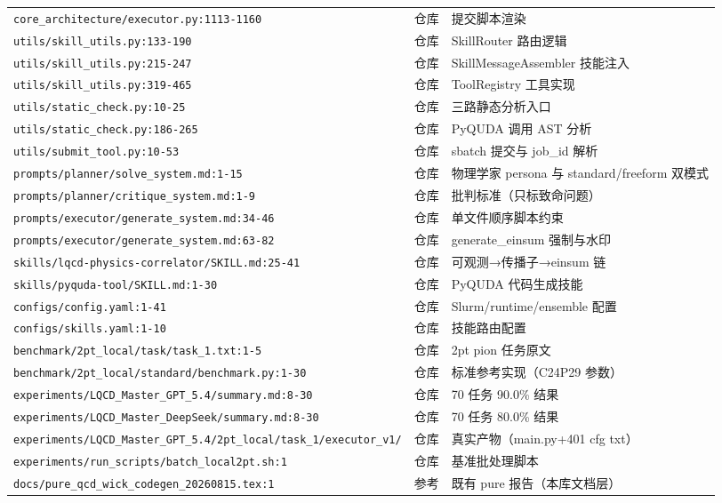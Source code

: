 \documentclass[UTF8]{ctexart}
\begin{document}
\begin{xltabular}{\textwidth}{XlX}
\texttt{\nolinkurl{core_architecture/executor.py:1113-1160}} & 仓库 & 提交脚本渲染 \\
\texttt{\nolinkurl{utils/skill_utils.py:133-190}} & 仓库 & SkillRouter 路由逻辑 \\
\texttt{\nolinkurl{utils/skill_utils.py:215-247}} & 仓库 & SkillMessageAssembler 技能注入 \\
\texttt{\nolinkurl{utils/skill_utils.py:319-465}} & 仓库 & ToolRegistry 工具实现 \\
\texttt{\nolinkurl{utils/static_check.py:10-25}} & 仓库 & 三路静态分析入口 \\
\texttt{\nolinkurl{utils/static_check.py:186-265}} & 仓库 & PyQUDA 调用 AST 分析 \\
\texttt{\nolinkurl{utils/submit_tool.py:10-53}} & 仓库 & sbatch 提交与 job\_id 解析 \\
\texttt{\nolinkurl{prompts/planner/solve_system.md:1-15}} & 仓库 & 物理学家 persona 与 standard/freeform 双模式 \\
\texttt{\nolinkurl{prompts/planner/critique_system.md:1-9}} & 仓库 & 批判标准（只标致命问题） \\
\texttt{\nolinkurl{prompts/executor/generate_system.md:34-46}} & 仓库 & 单文件顺序脚本约束 \\
\texttt{\nolinkurl{prompts/executor/generate_system.md:63-82}} & 仓库 & generate\_einsum 强制与水印 \\
\texttt{\nolinkurl{skills/lqcd-physics-correlator/SKILL.md:25-41}} & 仓库 & 可观测→传播子→einsum 链 \\
\texttt{\nolinkurl{skills/pyquda-tool/SKILL.md:1-30}} & 仓库 & PyQUDA 代码生成技能 \\
\texttt{\nolinkurl{configs/config.yaml:1-41}} & 仓库 & Slurm/runtime/ensemble 配置 \\
\texttt{\nolinkurl{configs/skills.yaml:1-10}} & 仓库 & 技能路由配置 \\
\texttt{\nolinkurl{benchmark/2pt_local/task/task_1.txt:1-5}} & 仓库 & 2pt pion 任务原文 \\
\texttt{\nolinkurl{benchmark/2pt_local/standard/benchmark.py:1-30}} & 仓库 & 标准参考实现（C24P29 参数） \\
\texttt{\nolinkurl{experiments/LQCD_Master_GPT_5.4/summary.md:8-30}} & 仓库 & 70 任务 90.0\% 结果 \\
\texttt{\nolinkurl{experiments/LQCD_Master_DeepSeek/summary.md:8-30}} & 仓库 & 70 任务 80.0\% 结果 \\
\texttt{\nolinkurl{experiments/LQCD_Master_GPT_5.4/2pt_local/task_1/executor_v1/}} & 仓库 & 真实产物（main.py+401 cfg txt） \\
\texttt{\nolinkurl{experiments/run_scripts/batch_local2pt.sh:1}} & 仓库 & 基准批处理脚本 \\
\texttt{\nolinkurl{docs/pure_qcd_wick_codegen_20260815.tex:1}} & 参考 & 既有 pure 报告（本库文档层） \\
\bottomrule
\end{xltabular}
\end{document}
